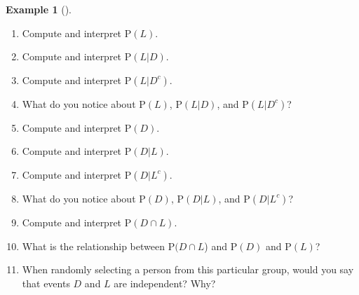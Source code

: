 \documentclass[
  letterpaper,
  DIV=11,
  numbers=noendperiod]{scrreprt}
\providecommand{\tightlist}{%
  \setlength{\itemsep}{0pt}\setlength{\parskip}{0pt}}
\theoremstyle{plain}
\theoremstyle{definition}
\newtheorem{example}{Example}[chapter]
\theoremstyle{definition}
\theoremstyle{definition}
\theoremstyle{remark}
\begin{document}
\begin{tcolorbox}[enhanced jigsaw, opacityback=0, left=2mm, colframe=quarto-callout-note-color-frame, toprule=.15mm, breakable, colback=white, leftrule=.75mm, arc=.35mm, rightrule=.15mm, bottomrule=.15mm]
\begin{example}[]
\begin{enumerate}
\def\labelenumi{\arabic{enumi}.}
\tightlist
\item
  Compute and interpret \(\textrm{P}(L)\).
\item
  Compute and interpret \(\textrm{P}(L|D)\).
\item
  Compute and interpret \(\textrm{P}(L|D^c)\).
\item
  What do you notice about \(\textrm{P}(L)\), \(\textrm{P}(L|D)\), and
  \(\textrm{P}(L|D^c)\)?
\item
  Compute and interpret \(\textrm{P}(D)\).
\item
  Compute and interpret \(\textrm{P}(D|L)\).
\item
  Compute and interpret \(\textrm{P}(D|L^c)\).
\item
  What do you notice about \(\textrm{P}(D)\), \(\textrm{P}(D|L)\), and
  \(\textrm{P}(D|L^c)\)?
\item
  Compute and interpret \(\textrm{P}(D \cap L)\).
\item
  What is the relationship between \(\textrm{P}(D \cap L\)) and
  \(\textrm{P}(D)\) and \(\textrm{P}(L)\)?
\item
  When randomly selecting a person from this particular group, would you
  say that events \(D\) and \(L\) are independent? Why?
\end{enumerate}

\end{example}

\end{tcolorbox}
\end{document}
